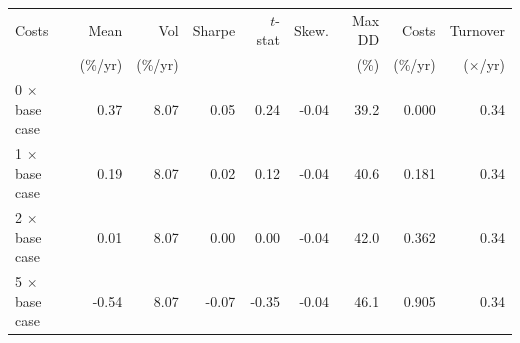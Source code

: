 \begin{tabular}{@{}lrrrrrrrr@{}}
\toprule
Costs & Mean & Vol & Sharpe & $t$-stat & Skew. & Max DD & Costs & Turnover \\
 & (\%/yr) & (\%/yr) & & & & (\%) & (\%/yr) & ($\times$/yr) \\
\midrule
0 $\times$ base case & 0.37 & 8.07 & 0.05 & 0.24 & -0.04 & 39.2 & 0.000 & 0.34 \\
1 $\times$ base case & 0.19 & 8.07 & 0.02 & 0.12 & -0.04 & 40.6 & 0.181 & 0.34 \\
2 $\times$ base case & 0.01 & 8.07 & 0.00 & 0.00 & -0.04 & 42.0 & 0.362 & 0.34 \\
5 $\times$ base case & -0.54 & 8.07 & -0.07 & -0.35 & -0.04 & 46.1 & 0.905 & 0.34 \\
\bottomrule
\end{tabular}
